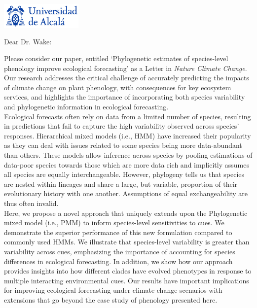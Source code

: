 \documentclass[11pt,a4paper]{letter}
\begin{document}
\begin{letter}{}
\includegraphics[width=0.3\textwidth]{logo_uah.png}

\opening{Dear Dr. Wake:}

\noindent Please consider our paper, entitled `Phylogenetic estimates of species-level phenology improve ecological forecasting' as a Letter in \emph{Nature Climate Change}. Our research addresses the critical challenge of accurately predicting the impacts of climate change on plant phenology, with consequences for key ecosystem services, and highlights the importance of incorporating both species variability and phylogenetic information in ecological forecasting.
\vspace{1.5ex}\\
Ecological forecasts often rely on data from a limited number of species, resulting in predictions that fail to capture the high variability observed across species' responses. Hierarchical mixed models (i.e., HMM) have increased their popularity as they can deal with issues related to some species being more data-abundant than others. These models allow inference across species by pooling estimations of data-poor species towards those which are more data rich and implicitly assumes all species are equally interchangeable. However, phylogeny tells us that species are nested within lineages and share a large, but variable, proportion of their evolutionary history with one another. Assumptions of equal exchangeability are thus often invalid.
\vspace{1.5ex}\\
Here, we propose a novel approach that uniquely extends upon the Phylogenetic mixed model (i.e., PMM)   to inform species-level sensitivities to cues. We demonstrate the superior performance of this new formulation compared to commonly used HMMs. We illustrate that species-level variability is greater than variability across cues, emphasizing the importance of accounting for species differences in ecological forecasting. In addition, we show how our approach provides insights into how different clades have evolved phenotypes in response to multiple interacting environmental cues. Our results have important implications for improving ecological forecasting under climate change scenarios with extensions that go beyond the case study of phenology presented here.
\vspace{1.5ex}\\

\end{letter}
\end{document}
